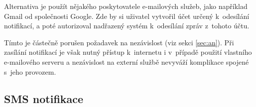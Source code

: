 Alternativa je použít nějakého poskytovatele e-mailových služeb, jako například Gmail od společnosti Google. Zde by si uživatel vytvořil účet určený k~odesílání notifikací, a poté autorizoval nadřazený systém k~odesílání zpráv z~tohoto účtu. 

Tímto je částečně porušen požadavek na nezávislost (viz sekci \ref{sec:an}). Při zasílání notifikací je však nutný přístup k~internetu i v~případě použití vlastního e-mailového serveru a nezávislost na externí službě nevyváží komplikace spojené s~jeho provozem.





\subsection{SMS notifikace}



